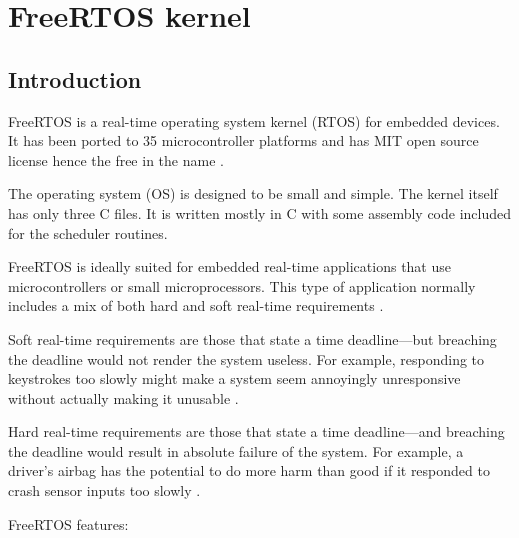 \chapter{FreeRTOS kernel} %
\label{freertos_kernel}

\section{Introduction}

FreeRTOS is a real-time operating system kernel (RTOS) for embedded devices. It has been ported to 35 microcontroller platforms and has MIT open source license hence the free in the name  \citep{freertos_licence}.

The operating system (OS) is designed to be small and simple. The kernel itself has only three C files. It is written mostly in C with some assembly code included for the scheduler routines.

FreeRTOS is ideally suited for embedded real-time applications that use
microcontrollers or small microprocessors. This type of application normally includes a mix of
both hard and soft real-time requirements \citep{freertos_mastering}.

Soft real-time requirements are those that state a time deadline—but breaching the deadline
would not render the system useless. For example, responding to keystrokes too slowly might
make a system seem annoyingly unresponsive without actually making it unusable \citep{freertos_mastering}.

Hard real-time requirements are those that state a time deadline—and breaching the deadline
would result in absolute failure of the system. For example, a driver’s airbag has the potential
to do more harm than good if it responded to crash sensor inputs too slowly \citep{freertos_mastering}.

\noindent FreeRTOS features:

